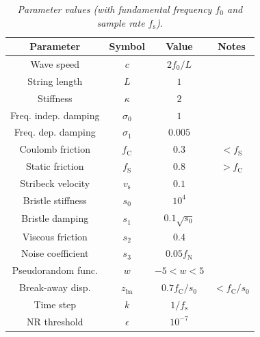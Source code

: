 \documentclass[twoside,a4paper,dvipsnames]{article}
\begin{document}
\begin{table}[ht]
  \caption{{\it Parameter values (with fundamental frequency $f_0$ and sample rate $f_\text{s}$).}}
	\centering
  \begin{tabular}{|c|c|c|c|}\hline
    Parameter & Symbol & Value & Notes\\ \hline
    Wave speed & $c$ & $2 f_0/L$ & \\
    String length & $L$ & $1$ & \\
    Stiffness & $\kappa$ & $2$ & \\
    Freq. indep. damping & $\sigma_0$ & $1$ & \\
    Freq. dep. damping & $\sigma_1$ & $0.005$ & \\
    Coulomb friction & $f_\text{C}$ & $0.3$ & $<f_\text{S}$ \\
    Static friction & $f_\text{S}$ & $0.8$ & $>f_\text{C}$ \\
    Stribeck velocity & $v_\text{s}$ & $0.1$ & \\
    Bristle stiffness & $s_0$ & $10^4$ & \\
    Bristle damping & $s_1$ & $0.1\sqrt{s_0}$ & \\
    Viscous friction & $s_2$ & $0.4$ & \\
    Noise coefficient & $s_3$ & $0.05f_\text{N}$ & \\
    Pseudorandom func. & $w$ & $-5<w<5$ & \\
    Break-away disp.& $z_\text{ba}$ & $0.7 f_\text{C}/s_0$ & $<f_\text{C}/s_0$ \\
    Time step & $k$ & $1/f_\text{s}$ & \\
    NR threshold & $\epsilon$ & $10^{-7}$ & \\
    \hline
 \end{tabular}
  \label{tab:parameters}
\end{table}
\end{document}
